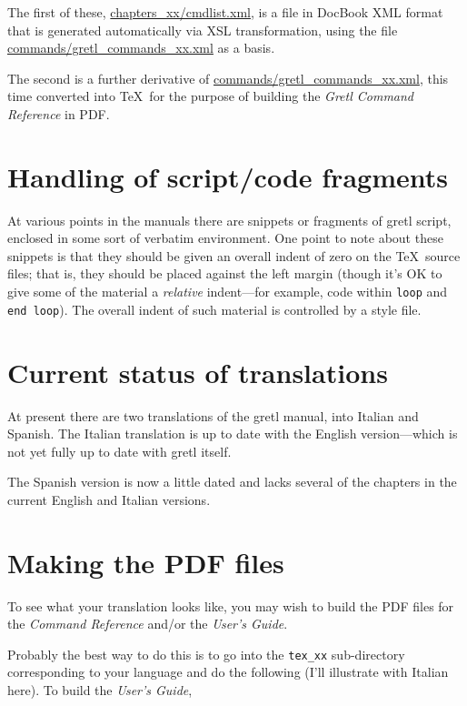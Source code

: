 \documentclass{article}
\begin{document}
The first of these, \url{chapters_xx/cmdlist.xml}, is a file in
DocBook XML format that is generated automatically via XSL
transformation, using the file \url{commands/gretl_commands_xx.xml} as
a basis.  

The second is a further derivative of
\url{commands/gretl_commands_xx.xml}, this time converted into \TeX\ 
for the purpose of building the \textit{Gretl Command Reference} in
PDF.

\section{Handling of script/code fragments}

At various points in the manuals there are snippets or fragments of
\textsf{gretl} script, enclosed in some sort of verbatim environment.
One point to note about these snippets is that they should be given an
overall indent of zero on the \TeX\ source files; that is, they should
be placed against the left margin (though it's OK to give some of the
material a \textit{relative} indent---for example, code within
\texttt{loop} and \texttt{end loop}).  The overall indent of such
material is controlled by a style file.

\section{Current status of translations}

At present there are two translations of the \textsf{gretl} manual,
into Italian and Spanish.  The Italian translation is up to date with
the English version---which is not yet fully up to date with
\textsf{gretl} itself.

The Spanish version is now a little dated and lacks several of the
chapters in the current English and Italian versions.  

\section{Making the PDF files}

To see what your translation looks like, you may wish to build the PDF
files for the \textit{Command Reference} and/or the \textit{User's
  Guide}.

Probably the best way to do this is to go into the \texttt{tex\_xx}
sub-directory corresponding to your language and do the following
(I'll illustrate with Italian here).  To build the \textit{User's
  Guide},
\end{document}
